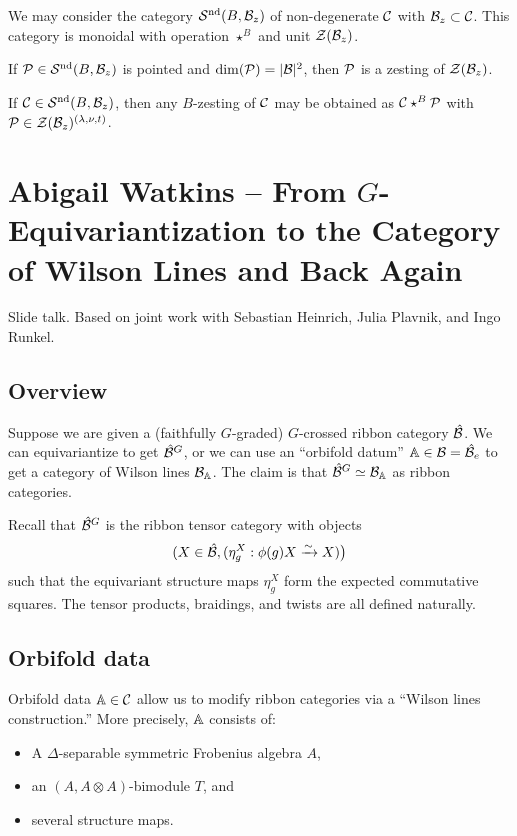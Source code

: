 \documentclass{amsart}
\begin{document}
We may consider the category  $\Sc^\nd(B, \Bc_z)$ of non-degenerate $\Cc$ with $\Bc_z \subset \Cc$.
This category is monoidal with operation $\star^B$ and unit $\Zc(\Bc_z)$.

\begin{thm}
  If $\Pc \in \Sc^\nd(B, \Bc_z)$ is pointed and $\dim(\Pc) = |\Bc|^2$, then $\Pc$ is a zesting of $\Zc(\Bc_z)$.
\end{thm}

\begin{thm}
  If $\Cc \in \Sc^\nd(B, \Bc_z)$, then any $B$-zesting of $\Cc$ may be obtained as $\Cc \star^B \Pc$ with $\Pc \in \Zc(\Bc_z)^{(\lambda,\nu,t)}$.
\end{thm}

\section{Abigail Watkins -- From $G$-Equivariantization to the Category of Wilson Lines and Back Again}

Slide talk.
Based on joint work with Sebastian Heinrich, Julia Plavnik, and Ingo Runkel.

\subsection{Overview}

Suppose we are given a (faithfully $G$-graded) $G$-crossed ribbon category $\hat{\Bc}$.
We can equivariantize to get $\hat{\Bc}^G$, or we can use an ``orbifold datum'' $\AA \in \Bc = \hat{\Bc}_e$ to get a category of Wilson lines $\Bc_\AA$.
The claim is that $\hat{\Bc}^G \simeq \Bc_\AA$ as ribbon categories.

Recall that $\hat{\Bc}^G$ is the ribbon tensor category with objects 
\[
  (X \in \hat{\Bc}, (\eta_g^X: \phi(g) X \xrightarrow{\sim} X)\big)
\]
such that the equivariant structure maps $\eta_g^X$ form the expected commutative squares.
The tensor products, braidings, and twists are all defined naturally.

\subsection{Orbifold data}

Orbifold data $\AA \in \Cc$ allow us to modify ribbon categories via a ``Wilson lines construction.''
More precisely, $\AA$ consists of:
\begin{itemize}
  \item A $\Delta$-separable symmetric Frobenius algebra $A$,
  \item an $(A, A \otimes A)$-bimodule $T$, and
  \item several structure maps.
\end{itemize}
\end{document}
